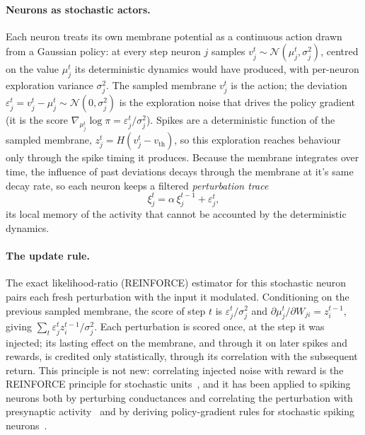 \documentclass[10pt,twocolumn]{article}
\begin{document}
\paragraph{Neurons as stochastic actors.}
Each neuron treats its own membrane potential as a continuous action drawn from
a Gaussian policy: at every step neuron $j$ samples
$v^t_j\sim\mathcal{N}(\mu^t_j,\sigma_j^2)$, centred on the value $\mu^t_j$ its
deterministic dynamics would have produced, with per-neuron exploration variance
$\sigma_j^2$. The sampled membrane $v^t_j$ is the action; the deviation
$\varepsilon^t_j = v^t_j-\mu^t_j\sim\mathcal{N}(0,\sigma_j^2)$ is the exploration
noise that drives the policy gradient (it is the score
$\nabla_{\mu^t_j}\log\pi = \varepsilon^t_j/\sigma_j^2$). Spikes are a
deterministic function of the sampled membrane,
$z^t_j=H(v^t_j-v_{\mathrm{th}})$, so this exploration reaches behaviour only
through the spike timing it produces. Because the membrane integrates over time,
the influence of past deviations decays through the membrane at it's same decay rate, so each neuron keeps a filtered \emph{perturbation trace}
\begin{equation}
\xi^t_j = \alpha\,\xi^{t-1}_j + \varepsilon^t_j,
\label{eq:perturbation-trace}
\end{equation}
its local memory of the activity that cannot be accounted by the deterministic dynamics.

\paragraph{The update rule.}
The exact likelihood-ratio (REINFORCE) estimator for this stochastic neuron
pairs each fresh perturbation with the input it modulated. Conditioning on the
previous sampled membrane, the score of step $t$ is $\varepsilon^t_j/\sigma_j^2$
and $\partial\mu^t_j/\partial W_{ji}=z^{t-1}_i$, giving
$\sum_t\varepsilon^t_j z^{t-1}_i/\sigma_j^2$. Each perturbation is scored once,
at the step it was injected; its lasting effect on the membrane, and through it
on later spikes and rewards, is credited only statistically, through its
correlation with the subsequent return. This principle is not new: correlating
injected noise with reward is the REINFORCE principle for stochastic
units~\citep{Williams1992REINFORCE}, and it has been applied to spiking neurons
both by perturbing conductances and correlating the perturbation with
presynaptic activity~\citep{fiete2006gradient} and by deriving policy-gradient
rules for stochastic spiking neurons~\citep{Florian2007RewardSTDP}.
\end{document}
